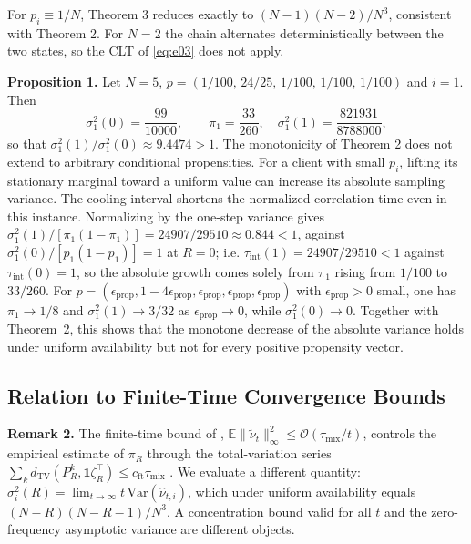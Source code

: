 \documentclass[twoside,11pt]{article}
\begin{document}
For $p_i\equiv1/N$, Theorem 3 reduces exactly to $(N-1)(N-2)/N^{3}$, consistent with Theorem 2. For $N=2$ the chain alternates deterministically between the two states, so the CLT of \eqref{eq:e03} does not apply.

\textbf{Proposition 1.} Let $N=5$, $p=(1/100,\,24/25,\,1/100,\,1/100,\,1/100)$ and $i=1$. Then
\begin{equation}\label{eq:e09}
\sigma_1^{2}(0)=\dfrac{99}{10000},\qquad \pi_1=\dfrac{33}{260},\quad \sigma_1^{2}(1)=\dfrac{821931}{8788000},
\end{equation}
so that $\sigma_1^{2}(1)/\sigma_1^{2}(0)\approx9.4474>1$. The monotonicity of Theorem 2 does not extend to arbitrary conditional propensities. For a client with small $p_i$, lifting its stationary marginal toward a uniform value can increase its absolute sampling variance. The cooling interval shortens the normalized correlation time even in this instance. Normalizing by the one-step variance gives $\sigma_1^{2}(1)/[\pi_1(1-\pi_1)]=24907/29510\approx0.844<1$, against $\sigma_1^{2}(0)/[p_1(1-p_1)]=1$ at $R=0$; i.e. $\tau_{\mathrm{int}}(1)=24907/29510<1$ against $\tau_{\mathrm{int}}(0)=1$, so the absolute growth comes solely from $\pi_1$ rising from $1/100$ to $33/260$. For $p=(\epsilon_{\mathrm{prop}},1-4\epsilon_{\mathrm{prop}},\epsilon_{\mathrm{prop}},\epsilon_{\mathrm{prop}},\epsilon_{\mathrm{prop}})$ with $\epsilon_{\mathrm{prop}}>0$ small, one has $\pi_1\to1/8$ and $\sigma_1^{2}(1)\to3/32$ as $\epsilon_{\mathrm{prop}}\to0$, while $\sigma_1^{2}(0)\to0$. Together with Theorem~2, this shows that the monotone decrease of the absolute variance holds under uniform availability but not for every positive propensity vector.

\subsection{Relation to Finite-Time Convergence Bounds}
\textbf{Remark 2.} The finite-time bound of \citep[Lemma~2]{ref1}, $\mathbb{E}\|\tilde\nu_t\|_\infty^{2}\leq\mathcal{O}(\tau_{\mathrm{mix}}/t)$, controls the empirical estimate of $\pi_R$ through the total-variation series $\sum_k d_{\mathrm{TV}}(P_R^{k},\mathbf{1}\zeta_R^{\top})\leq c_{\mathrm{ft}}\tau_{\mathrm{mix}}$ \citep[Lemma~5(3)]{ref1}. We evaluate a different quantity: $\sigma_i^{2}(R)=\lim_{t\to\infty}t\,\mathrm{Var}(\hat\nu_{t,i})$, which under uniform availability equals $(N-R)(N-R-1)/N^{3}$. A concentration bound valid for all $t$ and the zero-frequency asymptotic variance are different objects.
\end{document}
